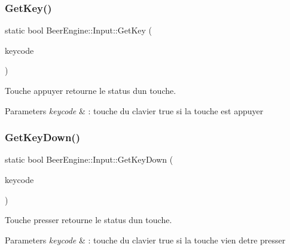 \subsubsection{\texorpdfstring{Get\+Key()}{GetKey()}}
{\footnotesize\ttfamily static bool Beer\+Engine\+::\+Input\+::\+Get\+Key (\begin{DoxyParamCaption}\item[{\mbox{\hyperlink{namespace_beer_engine_a94f0b552f6dc910de8cdb44207981f53}{Key\+Code}}}]{keycode }\end{DoxyParamCaption})\hspace{0.3cm}{\ttfamily [static]}}



Touche appuyer retourne le status d\textquotesingle{}un touche. 


\begin{DoxyParams}{Parameters}
{\em keycode} & \+: touche du clavier  true si la touche est appuyer \\
\hline
\end{DoxyParams}
\mbox{\label{class_beer_engine_1_1_input_ab3093c905099025b3dcd0c67dc31ed82}} 
\subsubsection{\texorpdfstring{Get\+Key\+Down()}{GetKeyDown()}}
{\footnotesize\ttfamily static bool Beer\+Engine\+::\+Input\+::\+Get\+Key\+Down (\begin{DoxyParamCaption}\item[{\mbox{\hyperlink{namespace_beer_engine_a94f0b552f6dc910de8cdb44207981f53}{Key\+Code}}}]{keycode }\end{DoxyParamCaption})\hspace{0.3cm}{\ttfamily [static]}}



Touche presser retourne le status d\textquotesingle{}un touche. 


\begin{DoxyParams}{Parameters}
{\em keycode} & \+: touche du clavier  true si la touche vien d\textquotesingle{}etre presser \\
\hline
\end{DoxyParams}
\mbox{\label{class_beer_engine_1_1_input_a36af1091a677481607d7a197585fd379}} 
